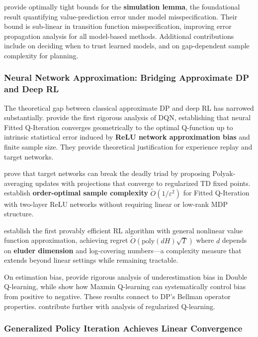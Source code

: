 \citet{lobel2024simulation} provide optimally tight bounds for the \textbf{simulation lemma}, the foundational result quantifying value-prediction error under model misspecification. Their bound is sub-linear in transition function misspecification, improving error propagation analysis for all model-based methods. Additional contributions include \citet{janner2019model} on deciding when to trust learned models, and \citet{grill2020planning} on gap-dependent sample complexity for planning.

\subsubsection{Neural Network Approximation: Bridging Approximate DP and Deep RL}

The theoretical gap between classical approximate DP and deep RL has narrowed substantially. \citet{fan2020dqn} provide the first rigorous analysis of DQN, establishing that neural Fitted Q-Iteration converges geometrically to the optimal Q-function up to intrinsic statistical error induced by \textbf{ReLU network approximation bias} and finite sample size. They provide theoretical justification for experience replay and target networks.

\citet{zhang2021target} prove that target networks can break the deadly triad by proposing Polyak-averaging updates with projections that converge to regularized TD fixed points. \citet{gaur2023fqi} establish \textbf{order-optimal sample complexity} $\tilde{O}(1/\varepsilon^2)$ for Fitted Q-Iteration with two-layer ReLU networks without requiring linear or low-rank MDP structure.

\citet{wang2020eluder} establish the first provably efficient RL algorithm with general nonlinear value function approximation, achieving regret $\tilde{O}(\mathrm{poly}(dH)\sqrt{T})$ where $d$ depends on \textbf{eluder dimension} and log-covering numbers---a complexity measure that extends beyond linear settings while remaining tractable.

On estimation bias, \citet{ren2021underestimation} provide rigorous analysis of underestimation bias in Double Q-learning, while \citet{lan2020maxmin} show how Maxmin Q-learning can systematically control bias from positive to negative. These results connect to DP's Bellman operator properties. \citet{lim2024regularized} contribute further with analysis of regularized Q-learning.

\subsubsection{Generalized Policy Iteration Achieves Linear Convergence}

